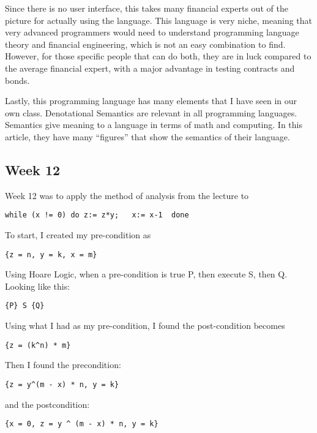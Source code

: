\documentclass{article}
\theoremstyle{theorem}
\theoremstyle{definition}
\theoremstyle{remark}
\begin{document}
\noindent\newline Since there is no user interface, this takes many financial experts out of the picture for actually using the language. This language is very niche, meaning that very advanced programmers would need to understand programming language theory and financial engineering, which is not an easy combination to find. However, for those specific people that can do both, they are in luck compared to the average financial expert, with a major advantage in testing contracts and bonds.

\noindent\newline Lastly, this programming language has many elements that I have seen in our own class. Denotational Semantics are relevant in all programming languages. Semantics give meaning to a language in terms of math and computing. In this article, they have many “figures” that show the semantics of their language.

\subsection{Week 12}
Week 12 was to apply the method of analysis from the lecture to
\begin{verbatim}
while (x != 0) do z:= z*y;   x:= x-1  done
\end{verbatim}

\noindent\newline\newline To start, I created my pre-condition as
\begin{verbatim}
{z = n, y = k, x = m}
\end{verbatim}

\noindent Using Hoare Logic, when a pre-condition is true P, then execute S, then Q.
\noindent Looking like this:
\begin{verbatim}
{P} S {Q}
\end{verbatim}

\noindent\newline\newline Using what I had as my pre-condition, I found the post-condition becomes
\begin{verbatim}
{z = (k^n) * m}
\end{verbatim}

\noindent\newline\newline Then I found the precondition:
\begin{verbatim}
{z = y^(m - x) * n, y = k}
\end{verbatim}
\noindent\newline and the postcondition:
\begin{verbatim}
{x = 0, z = y ^ (m - x) * n, y = k}
\end{verbatim}
\end{document}
